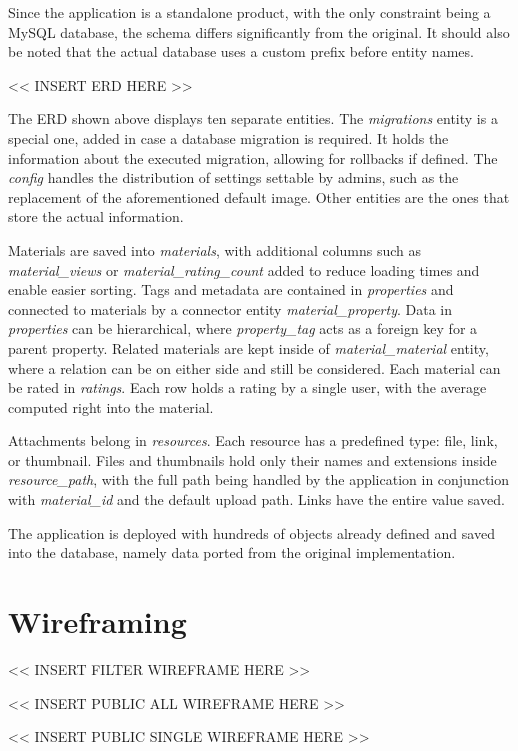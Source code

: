 \documentclass[
  digital,     %
  oneside,     %
  nosansbold,  %
  colorbold, %
  lof,         %
  lot,         %
]{fithesis4}
\begin{document}
Since the application is a standalone product, with the only constraint being a MySQL database, the schema differs significantly from the original. It should also be noted that the actual database uses a custom prefix before entity names.

<< INSERT ERD HERE >>

The ERD shown above displays ten separate entities. The \textit{migrations} entity is a special one, added in case a database migration is required. It holds the information about the executed migration, allowing for rollbacks if defined. The \textit{config} handles the distribution of settings settable by admins, such as the replacement of the aforementioned default image. Other entities are the ones that store the actual information.

Materials are saved into \textit{materials}, with additional columns such as \textit{material\_views} or \textit{material\_rating\_count} added to reduce loading times and enable easier sorting. Tags and metadata are contained in \textit{properties} and connected to materials by a connector entity \textit{material\_property}. Data in \textit{properties} can be hierarchical, where \textit{property\_tag} acts as a foreign key for a parent property. Related materials are kept inside of \textit{material\_material} entity, where a relation can be on either side and still be considered. Each material can be rated in \textit{ratings}. Each row holds a rating by a single user, with the average computed right into the material.

Attachments belong in \textit{resources}. Each resource has a predefined type: file, link, or thumbnail. Files and thumbnails hold only their names and extensions inside \textit{resource\_path}, with the full path being handled by the application in conjunction with \textit{material\_id} and the default upload path. Links have the entire value saved.

The application is deployed with hundreds of objects already defined and saved into the database, namely data ported from the original implementation.

\section{Wireframing}

<< INSERT FILTER WIREFRAME HERE >>

<< INSERT PUBLIC ALL WIREFRAME HERE >>

<< INSERT PUBLIC SINGLE WIREFRAME HERE >>
\end{document}
